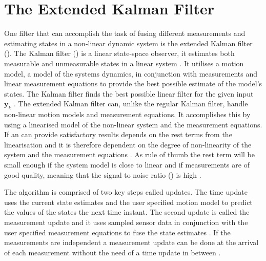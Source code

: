 \section{The Extended Kalman Filter}
One filter that can accomplish the task of fusing different measurements and estimating states in a non-linear dynamic system is the extended Kalman filter (\abbrEKF). The Kalman filter (\abbrKF) is a linear state-space observer, it estimates both measurable and unmeasurable states in a linear system \citep{sensorfusion}. It utilises a motion model, a model of the systems dynamics, in conjunction with measurements and linear measurement equations to provide the best possible estimate of the model's states. The Kalman filter finds the best possible linear filter for the given input $\boldsymbol{y}_{k}$ \citep{sensorfusion}. The extended Kalman filter can, unlike the regular Kalman filter, handle non-linear motion models and measurement equations. It accomplishes this by using a linearised model of the non-linear system and the measurement equations. If an \abbrEKF can provide satisfactory results depends on the rest terms from the linearisation and it is therefore dependent on the degree of non-linearity of the system and the measurement equations \citep{sensorfusion}. As rule of thumb the rest term will be small enough if the system model is close to linear and if measurements are of good quality, meaning that the signal to noise ratio (\abbrSNR) is high \citep{sensorfusion}. 

The \abbrEKF algorithm is comprised of two key steps called updates.
The time update uses the current state estimates and the user specified motion model to predict the values of the states the next time instant. The second update is called the measurement update and it uses sampled sensor data in conjunction with the user specified measurement equations to fuse the state estimates \citep{sensorfusion}.
If the measurements are independent a measurement update can be done at the arrival of each measurement without the need of a time update in between \citep[p. 170]{sensorfusion}.

